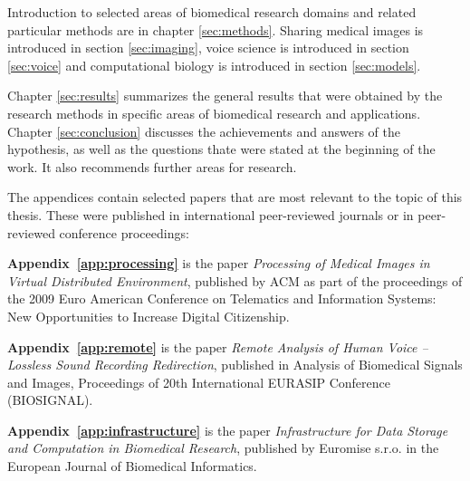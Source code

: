 
Introduction to selected areas of biomedical research domains and related particular methods are in chapter \ref{sec:methods}. Sharing medical images is introduced in section \ref{sec:imaging}, voice science is introduced in section \ref{sec:voice} and computational biology is introduced in section \ref{sec:models}.

Chapter \ref{sec:results} summarizes the general results that were obtained by the research methods in specific areas of biomedical research and applications. Chapter \ref{sec:conclusion} discusses the achievements and answers of the hypothesis, as well as the questions thate were stated at the beginning of the work. It also recommends further areas for research.

The appendices contain selected papers \cite{kulhanek2009,kulhanek2010b,kulhanek2010c,Kulhanek2014Parameters, Kulhanek2014Modeling, Kulhanek2014mefanet, Matejak2014sj} that are most relevant to the topic of this thesis. These were published in international peer-reviewed journals or in peer-reviewed conference proceedings:

\textbf{Appendix~\ref{app:processing}} is the paper \cite{kulhanek2009} \emph{Processing of Medical Images in Virtual Distributed Environment}, published by ACM as part of the proceedings of the 2009 Euro American Conference on Telematics and Information Systems: New Opportunities to Increase Digital Citizenship.

\textbf{Appendix~\ref{app:remote}} is the paper \cite{kulhanek2010b} \emph{Remote Analysis of Human Voice – Lossless Sound Recording Redirection}, published in Analysis of Biomedical Signals and Images, Proceedings of 20th International EURASIP Conference (BIOSIGNAL).


\textbf{Appendix~\ref{app:infrastructure}} is the paper \cite{kulhanek2010c} \emph{Infrastructure for Data Storage and Computation in Biomedical Research}, published by Euromise s.r.o. in the European Journal of Biomedical Informatics.

